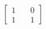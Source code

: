 \documentclass[preview]{standalone}
\begin{document}
\begin{align*}
\begin{bmatrix} 1 & \quad 0 \\ 1 & \quad 1 \end{bmatrix}
\end{align*}
\end{document}
